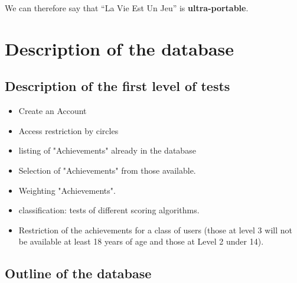 \documentclass {life-en}
\begin{document}
We can therefore say that ``La Vie Est Un Jeu'' is \textbf{ultra-portable}.


\chapter{Description of the database}

\section{Description of the first level of tests}

\begin{itemize}
  \item Create an Account
  \item Access restriction by circles
  \item listing of "Achievements" already in the database
  \item Selection of "Achievements" from those available.
  \item Weighting "Achievements".
  \item classification: tests of different scoring algorithms.
  \item Restriction of the achievements for a class of users (those at level 3 will not be available at least 18 years of age and those at Level 2 under 14).
\end{itemize}

\section{Outline of the database}
\end{document}
